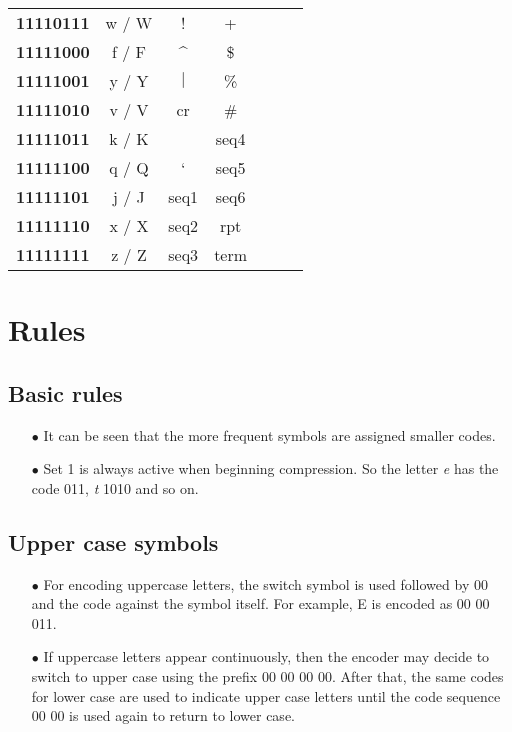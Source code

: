 \documentclass[]{article}
\begin{document}
\begin{center}
\begin{tabular}{ | l | c | c | c | c | c | c | }
		\textbf{11110111} & w / W & ! & + & & \\ \cline{1-4}
		\textbf{11111000} & f / F & \^{} & \$ & & \\ \cline{1-4}
		\textbf{11111001} & y / Y & $|$ & \% & & \\ \cline{1-4}
		\textbf{11111010} & v / V & cr & \# & & \\ \cline{1-4}
		\textbf{11111011} & k / K & ~ & seq4 & & \\ \cline{1-4}
		\textbf{11111100} & q / Q & ` & seq5 & & \\ \cline{1-4}
		\textbf{11111101} & j / J & seq1 & seq6 & & \\ \cline{1-4}
		\textbf{11111110} & x / X & seq2 & rpt & & \\ \cline{1-4}
		\textbf{11111111} & z / Z & seq3 & term & & \\ \hline
	\end{tabular}
\end{center}

\section{Rules}

\subsection{Basic rules}
\begin{itemize}
	\item[$\bullet$] It can be seen that the more frequent symbols are assigned smaller codes.
	\item[$\bullet$] Set 1 is always active when beginning compression.  So the letter \emph{e} has the code 011, \emph{t} 1010 and so on.
\end{itemize}

\subsection{Upper case symbols}
\begin{itemize}
	\item[$\bullet$] For encoding uppercase letters, the switch symbol is used followed by 00 and the code against the symbol itself.  For example, E is encoded as 00 00 011.
	\item[$\bullet$] If uppercase letters appear continuously, then the encoder may decide to switch to upper case using the prefix 00 00 00 00.  After that, the same codes for lower case are used to indicate upper case letters until the code sequence 00 00 is used again to return to lower case.
\end{itemize}
\end{document}

